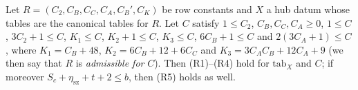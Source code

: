 \begin{lemma}\label{pf:linkN-sel:rownum}
Let $R=(C_2,C_B,C_C,C_A,C_B',C_K)$ be row constants and $X$ a hub datum whose tables are the canonical tables for $R$. Let $C$ satisfy
$1\le C_2$, $C_B,C_C,C_A\ge0$, $1\le C$, $3C_2+1\le C$, $K_1\le C$, $K_2+1\le C$, $K_3\le C$, $6C_B+1\le C$ and $2(3C_A+1)\le C$, where
$K_1=C_B+48$, $K_2=6C_B+12+6C_C$ and $K_3=3C_AC_B+12C_A+9$ (we then say that $R$ is \emph{admissible for} $C$). Then (R1)--(R4) hold for
$\mathrm{tab}_X$ and $C$; if moreover $S_c+\eta_{\mathrm{sz}}+t+2\le b$, then (R5) holds as well.
\end{lemma}

